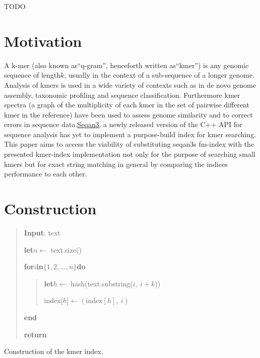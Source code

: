 \begin{abstractDE}
TODO
\end{abstractDE}
\vfill

\tableofcontents{}
\setcounter{page}{1}

\chapter{Motivation}

A k-mer (also known as``q-gram'', henceforth written as``kmer'')
is any genomic sequence of length$k$, usually in the context of a
sub-sequence of a longer genome. Analysis of kmers is used in a wide
variety of contexts such as in de novo genome assembly\cite{SOAPdenovo},
taxonomic profiling\cite{phenotype:classification:with:kmer:spectrum} and sequence
classification\cite{kraken:sequence:classification}. Furthermore kmer spectra (a
graph of the multiplicity of each kmer in the set of pairwise different
kmer in the reference) have been used to assess genome similarity\cite{kmer:spectrum:dissimilarity}
and to correct errors in sequence data\cite{musket:kmer:spectrum:error:correction}.\href{https://github.com/seqan/seqan3}{Seqan3},
a newly released version of the C++ API for sequence analysis has
yet to implement a purpose-build index for kmer searching. This paper
aims to access the viability of substituting seqan3s fm-index\cite{fm:index:master:thesis}
with the presented kmer-index implementation not only for the purpose
of searching small kmers but for exact string matching in general
by comparing the indices performance to each other.

\chapter{Construction}

\begin{algorithm}[H]
\begin{verse}
\textbf{Input}: text

\textbf{let}$n$$\leftarrow$ text.size()

\textbf{for}$i$\textbf{in}$\{1,2,...,n\}$\textbf{do}
\begin{verse}
\textbf{let}$h$$\leftarrow$ hash(text.substring($i,\:i+k$))

index{[}$h${]}$\leftarrow$$(\text{index}[h],\:i)$
\end{verse}
\textbf{end}

\textbf{return}
\end{verse}
\caption{Construction of the kmer index.}
\end{algorithm}

